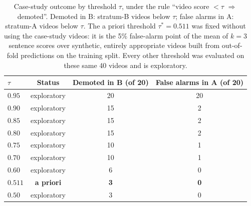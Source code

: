 \begin{table}[!t]
\centering
\caption{Case-study outcome by threshold $\tau$, under the rule ``video score $< \tau$ $\Rightarrow$ demoted''. Demoted in B: stratum-B videos below $\tau$; false alarms in A: stratum-A videos below $\tau$. The a priori threshold $\tau^{*} = 0.511$ was fixed without using the case-study videos: it is the 5\% false-alarm point of the mean of $k = 3$ sentence scores over synthetic, entirely appropriate videos built from out-of-fold predictions on the training split. Every other threshold was evaluated on these same 40 videos and is exploratory.}
\label{tab:limiares-estudo-caso}
\begin{tabular}{lccc}
\toprule
$\tau$ & Status & Demoted in B (of 20) & False alarms in A (of 20) \\
\midrule
$0.95$ & exploratory & 20 & 20 \\
$0.90$ & exploratory & 15 & 2 \\
$0.85$ & exploratory & 15 & 2 \\
$0.80$ & exploratory & 15 & 2 \\
$0.75$ & exploratory & 10 & 1 \\
$0.70$ & exploratory & 10 & 1 \\
$0.60$ & exploratory & 6 & 0 \\
\textbf{$0.511$} & \textbf{a priori} & \textbf{3} & \textbf{0} \\
$0.50$ & exploratory & 3 & 0 \\
\bottomrule
\end{tabular}
\end{table}
